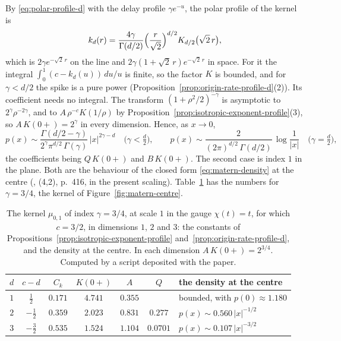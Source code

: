 \begin{example}
By \ref{eq:polar-profile-d} with the delay profile $\gamma e^{-u}$, the polar profile of the
kernel is
\[
  k_d(r) = \frac{4\gamma}{\Gamma(d/2)}\Bigl(\frac{r}{\sqrt2}\Bigr)^{d/2}K_{d/2}\bigl(\sqrt2\,r\bigr) ,
\]
which is $2\gamma e^{-\sqrt2\,r}$ on the line and $2\gamma(1 + \sqrt2\,r)e^{-\sqrt2\,r}$ in
space. For it the integral $\int_0^1 (c - k_d(u))\,du/u$ is finite, so the factor $K$ is
bounded, and for $\gamma < d/2$ the spike is a pure power
(Proposition~\ref{prop:origin-rate-profile-d}(2)). Its coefficient needs no integral. The
transform $(1 + \rho^2/2)^{-\gamma}$ is asymptotic to $2^{\gamma}\rho^{-2\gamma}$, and to
$A\,\rho^{-c}K(1/\rho)$ by Proposition~\ref{prop:isotropic-exponent-profile}(3), so
$A\,K(0{+}) = 2^{\gamma}$ in every dimension. Hence, as $x \to 0$,
\[
  p(x) \sim \frac{\Gamma(d/2 - \gamma)}{2^{\gamma}\pi^{d/2}\,\Gamma(\gamma)}\,|x|^{2\gamma - d}
  \quad \bigl(\gamma < \tfrac d2\bigr), \qquad
  p(x) \sim \frac{2}{(2\pi)^{d/2}\,\Gamma(d/2)}\,\log\frac{1}{|x|}
  \quad \bigl(\gamma = \tfrac d2\bigr) ,
\]
the coefficients being $Q\,K(0{+})$ and $B\,K(0{+})$. The second case is index $1$ in the
plane. Both are the behaviour of the closed form \ref{eq:matern-density} at the centre
(, (4,2), p.~416, in the present scaling). Table~\ref{tab:matern}
has the numbers for $\gamma = 3/4$, the kernel of Figure~\ref{fig:matern-centre}.
\end{example}

\begin{table}[!htb]
\centering
\small
\begin{tabular}{@{}ccccccl@{}}
\toprule
$d$ & $c - d$ & $C_k$ & $K(0{+})$ & $A$ & $Q$ & the density at the centre \\
\midrule
$1$ & $\tfrac12$ & $0.171$ & $4.741$ & $0.355$ & & bounded, with $p(0) \approx 1.180$ \\
$2$ & $-\tfrac12$ & $0.359$ & $2.023$ & $0.831$ & $0.277$ & $p(x) \sim 0.560\,|x|^{-1/2}$ \\
$3$ & $-\tfrac32$ & $0.535$ & $1.524$ & $1.104$ & $0.0701$ & $p(x) \sim 0.107\,|x|^{-3/2}$ \\
\bottomrule
\end{tabular}
\caption{The \Matern{} kernel $\mu_{0,1}$ of index $\gamma = 3/4$, at scale $1$ in the gauge
$\chi(t) = t$, for which $c = 3/2$, in dimensions $1$,
$2$ and $3$: the constants of Propositions~\ref{prop:isotropic-exponent-profile}
and~\ref{prop:origin-rate-profile-d}, and the density at the centre. In each dimension
$A\,K(0{+}) = 2^{3/4}$. Computed by a script deposited with the paper.}
\label{tab:matern}
\end{table}


